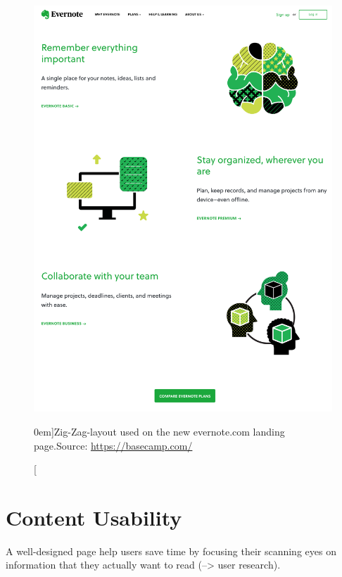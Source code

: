 \begin{figure}%
  \includegraphics[width=1.0\textwidth]{../figures/zig-zag-shape_evernote.png}
  \caption[][0em]{Zig-Zag-layout used on the new evernote.com landing page.\newline Source: \url{https://basecamp.com/}}
  \label{fig:z-shape_facebook}
\end{figure}










\section{Content Usability} %
\label{sec:content_usability}


A well-designed page help users save time by focusing their scanning eyes on information that they actually want to read (--> user research).

